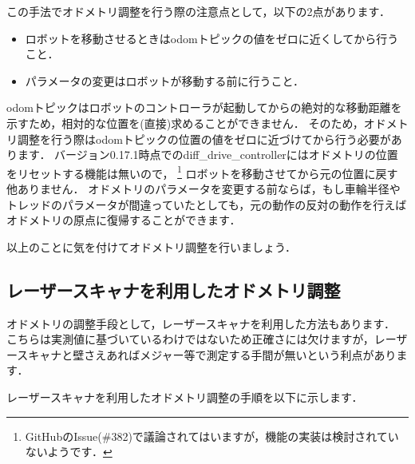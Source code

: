 \documentclass[{../../master}]{subfiles}
\begin{document}
この手法でオドメトリ調整を行う際の注意点として，以下の2点があります．

\begin{itemize}
  \item ロボットを移動させるときは\textsf{odom}トピックの値をゼロに近くしてから行うこと．
  \item パラメータの変更はロボットが移動する前に行うこと．
\end{itemize}

\textsf{odom}トピックはロボットのコントローラが起動してからの絶対的な移動距離を示すため，相対的な位置を(直接)求めることができません．
そのため，オドメトリ調整を行う際は\textsf{odom}トピックの位置の値をゼロに近づけてから行う必要があります．
バージョン0.17.1時点での\textsf{diff\_drive\_controller}にはオドメトリの位置をリセットする機能は無いので，
\footnote{GitHubのIssue(\#382)で議論されてはいますが，機能の実装は検討されていないようです．}
ロボットを移動させてから元の位置に戻す他ありません．
オドメトリのパラメータを変更する前ならば，もし車輪半径やトレッドのパラメータが間違っていたとしても，元の動作の反対の動作を行えばオドメトリの原点に復帰することができます．

以上のことに気を付けてオドメトリ調整を行いましょう．

\subsection{レーザースキャナを利用したオドメトリ調整}

オドメトリの調整手段として，レーザースキャナを利用した方法もあります．
こちらは実測値に基づいているわけではないため正確さには欠けますが，レーザースキャナと壁さえあればメジャー等で測定する手間が無いという利点があります．

レーザースキャナを利用したオドメトリ調整の手順を以下に示します．
\end{document}
